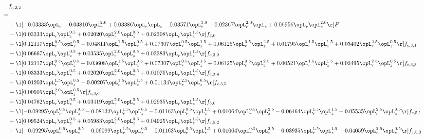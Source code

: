 \begin{alignat}{2} 
\label{eq:f_22_2} 
& f_{c,2,2} \nonumber \\ 
 = \\ 
& + \l[  -0.03333 \opL_r   -0.03810 \opL_r^{2.0} +  0.03386 \opL_r \opL_z   -0.03571 \opL_r^{3.0} +  0.02367 \opL_r^{2.0} \opL_z +  0.06956 \opL_r \opL_z^{2.0}  \r] F \nonumber \\ 
& - \l[  0.03333 \opL_r \opL_z^{0.5} +  0.02020 \opL_r^{2.0} \opL_z^{0.5} +  0.02308 \opL_r \opL_z^{1.5}  \r] f_{3,0} \nonumber \\ 
& + \l[  0.12117 \opL_r^{0.5} \opL_z^{0.5} +  0.04811 \opL_r^{1.5} \opL_z^{0.5} +  0.07307 \opL_r^{0.5} \opL_z^{1.5} +  0.06125 \opL_r^{0.5} \opL_z^{2.5} +  0.01795 \opL_r^{1.5} \opL_z^{1.5} +  0.03402 \opL_r^{2.5} \opL_z^{0.5}  \r] f_{c,3,1} \nonumber \\ 
& - \l[  0.06667 \opL_r \opL_z^{0.5} +  0.03535 \opL_r^{2.0} \opL_z^{0.5} +  0.03383 \opL_r \opL_z^{1.5}  \r] f_{c,3,2} \nonumber \\ 
& + \l[  0.12117 \opL_r^{0.5} \opL_z^{0.5} +  0.03608 \opL_r^{1.5} \opL_z^{0.5} +  0.07307 \opL_r^{0.5} \opL_z^{1.5} +  0.06125 \opL_r^{0.5} \opL_z^{2.5} +  0.00521 \opL_r^{1.5} \opL_z^{1.5} +  0.02495 \opL_r^{2.5} \opL_z^{0.5}  \r] f_{c,3,3} \nonumber \\ 
& - \l[  0.03333 \opL_r \opL_z^{0.5} +  0.02020 \opL_r^{2.0} \opL_z^{0.5} +  0.01075 \opL_r \opL_z^{1.5}  \r] f_{c,3,4} \nonumber \\ 
& + \l[  0.01203 \opL_r^{1.5} \opL_z^{0.5}   -0.00207 \opL_r^{1.5} \opL_z^{1.5} +  0.01134 \opL_r^{2.5} \opL_z^{0.5}  \r] f_{c,3,5} \nonumber \\ 
& - \l[  0.00505 \opL_r^{2.0} \opL_z^{0.5}  \r] f_{c,3,6} \nonumber \\ 
& + \l[  0.04762 \opL_r \opL_z^{0.5} +  0.03419 \opL_r^{2.0} \opL_z^{0.5} +  0.02935 \opL_r \opL_z^{1.5}  \r] f_{5,0} \nonumber \\ 
& + \l[  -0.09295 \opL_r^{0.5} \opL_z^{0.5}   -0.08132 \opL_r^{1.5} \opL_z^{0.5}   -0.01163 \opL_r^{0.5} \opL_z^{1.5} +  0.01064 \opL_r^{0.5} \opL_z^{2.5}   -0.06464 \opL_r^{1.5} \opL_z^{1.5}   -0.05535 \opL_r^{2.5} \opL_z^{0.5}  \r] f_{c,5,1} \nonumber \\ 
& + \l[  0.09524 \opL_r \opL_z^{0.5} +  0.05983 \opL_r^{2.0} \opL_z^{0.5} +  0.04925 \opL_r \opL_z^{1.5}  \r] f_{c,5,2} \nonumber \\ 
& + \l[  -0.09295 \opL_r^{0.5} \opL_z^{0.5}   -0.06099 \opL_r^{1.5} \opL_z^{0.5}   -0.01163 \opL_r^{0.5} \opL_z^{1.5} +  0.01064 \opL_r^{0.5} \opL_z^{2.5}   -0.03935 \opL_r^{1.5} \opL_z^{1.5}   -0.04059 \opL_r^{2.5} \opL_z^{0.5}  \r] f_{c,5,3} \nonumber \\ 

\end{alignat}
